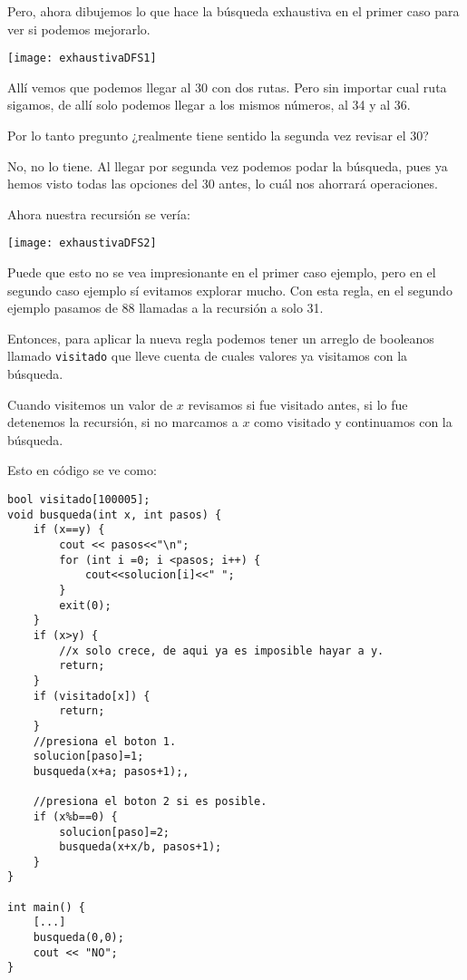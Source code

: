 Pero, ahora dibujemos lo que hace la búsqueda exhaustiva en el primer caso para ver si podemos mejorarlo.

\begin{center}
	\texttt{[image: exhaustivaDFS1]}
\end{center}

Allí vemos que podemos llegar al 30 con dos rutas. Pero sin importar cual ruta sigamos, de allí solo podemos llegar a los mismos números, al 34 y al 36.

Por lo tanto pregunto ¿realmente tiene sentido la segunda vez revisar el 30?

No, no lo tiene. Al llegar por segunda vez podemos podar la búsqueda, pues ya hemos visto todas las opciones del 30 antes, lo cuál nos ahorrará operaciones. 

Ahora nuestra recursión se vería:
\begin{center}
	\texttt{[image: exhaustivaDFS2]}
\end{center}

Puede que esto no se vea impresionante en el primer caso ejemplo, pero en el segundo caso ejemplo sí evitamos explorar mucho. Con esta regla, en el segundo ejemplo pasamos de 88 llamadas a la recursión a solo 31.

Entonces, para aplicar la nueva regla podemos tener un arreglo de booleanos llamado \verb|visitado| que lleve cuenta de cuales valores ya visitamos con la búsqueda.

Cuando visitemos un valor de \(x\) revisamos si fue visitado antes, si lo fue detenemos la recursión, si no marcamos a \(x\) como visitado y continuamos con la búsqueda.

Esto en código se ve como:

\begin{minipage}{\linewidth}
\begin{lstlisting}
bool visitado[100005];
void busqueda(int x, int pasos) {
	if (x==y) {
		cout << pasos<<"\n";
		for (int i =0; i <pasos; i++) {
			cout<<solucion[i]<<" ";
		}			
		exit(0);
	}
	if (x>y) {
		//x solo crece, de aqui ya es imposible hayar a y.
		return;
	}
	if (visitado[x]) {			
		return;
	}
	//presiona el boton 1.
	solucion[paso]=1;
	busqueda(x+a; pasos+1);,
	
	//presiona el boton 2 si es posible.
	if (x%b==0) {
		solucion[paso]=2;
		busqueda(x+x/b, pasos+1);
	}
}

int main() {
	[...]
	busqueda(0,0);
	cout << "NO";
}
\end{lstlisting}
\end{minipage}

